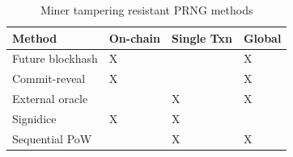 \documentclass[11pt]{article}
\begin{document}
\begin{table}[H]
\begin{center}
\begin{tabular}{| p{10em} | l | l | l |}
\hline
\textbf{Method} & \textbf{On-chain} & \textbf{Single Txn} & \textbf{Global} \\ \hline
Future blockhash & X & & X \\ \hline
Commit-reveal & X & & X \\ \hline
External oracle & & X & X \\ \hline
Signidice & X & X & \\ \hline
Sequential PoW & & X & X \\ \hline
\end{tabular}
\caption{Miner tampering resistant PRNG methods}
\label{tab:minerTamperingResistantPrngMethods}
\end{center}
\end{table}
\end{document}
